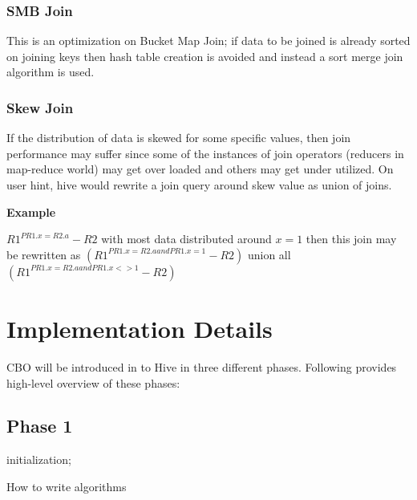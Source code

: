 \documentclass{vldb}
\begin{document}
\subsubsection*{SMB Join}
This is an optimization on Bucket Map Join; if data to be joined is already sorted on joining keys then hash table creation is avoided and instead a sort merge join algorithm is used.

\subsubsection*{Skew Join}
If the distribution of data is skewed for some specific values, then join performance may suffer since some of the instances of join operators (reducers in map-reduce world) may get over loaded and others may get under utilized. On user hint, hive would rewrite a join query around skew value as union of joins.

\noindent
\textbf{Example}

\noindent 
$R1^{PR1.x=R2.a} - R2$ with most data distributed around $x=1$ then this join may be rewritten as 
$(R1^{PR1.x=R2.a and PR1.x=1} - R2)$ union all $(R1^{PR1.x=R2.a and PR1.x<>1} - R2)$

\section{Implementation Details}
CBO will be introduced in to Hive in three different phases. Following provides high-level overview of these phases:


\subsection{Phase 1}

\begin{algorithm}[H]
 initialization; \\
 \caption{How to write algorithms}
\end{algorithm}
\end{document}
